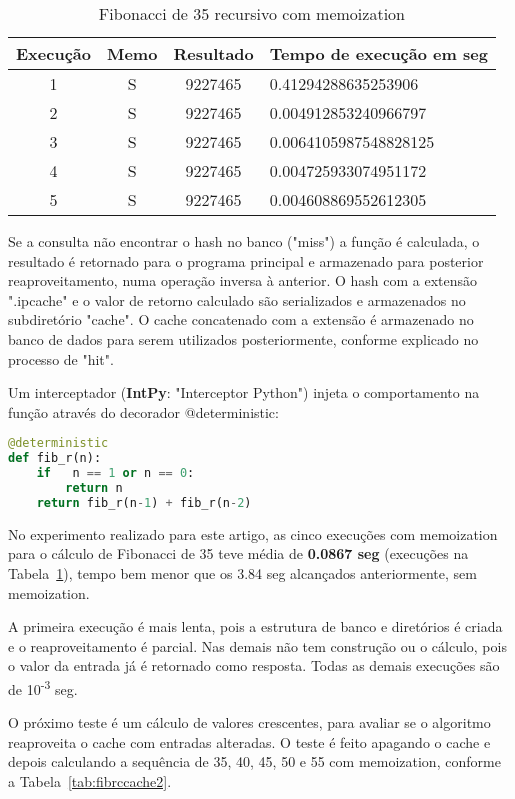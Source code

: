 \documentclass[sigconf]{acmart}
\begin{document}
\begin{table}[ht]
  \caption{Fibonacci de 35 recursivo com memoization}
  \label{tab:fibrccache}
  \begin{tabular}{cccl}
    \toprule
    Execução & Memo & Resultado & Tempo de execução em seg\\
    \midrule
    1 & S & 9227465 & 0.41294288635253906\\
    2 & S & 9227465 & 0.004912853240966797\\
    3 & S & 9227465 & 0.0064105987548828125\\
    4 & S & 9227465 & 0.004725933074951172\\
    5 & S & 9227465 & 0.004608869552612305\\
  \bottomrule
\end{tabular}
\end{table}

Se a consulta não encontrar o hash no banco ("miss") a função é calculada, o resultado é retornado para o programa principal e armazenado para posterior reaproveitamento, numa operação inversa à anterior. O hash com a extensão ".ipcache" e o valor de retorno calculado são serializados e armazenados no subdiretório "cache". O cache concatenado com a extensão é armazenado no banco de dados para serem utilizados posteriormente, conforme explicado no processo de "hit".

Um interceptador (\textbf{IntPy}: "Interceptor Python") injeta o comportamento na função através do decorador @deterministic:

\renewcommand{\lstlistingname}{Código}
\begin{lstlisting}[language=Python, caption=Fibonacci recursivo com memoization]
@deterministic
def fib_r(n):
    if   n == 1 or n == 0:
        return n
    return fib_r(n-1) + fib_r(n-2)
\end{lstlisting}

No experimento realizado para este artigo, as cinco execuções com memoization para o cálculo de Fibonacci de 35 teve média de \textbf{0.0867 seg} (execuções na Tabela~\ref{tab:fibrccache}), tempo bem menor que os 3.84 seg alcançados anteriormente, sem memoization.

A primeira execução é mais lenta, pois a estrutura de banco e diretórios é criada e o reaproveitamento é parcial. Nas demais não tem construção ou o cálculo, pois o valor da entrada já é retornado como resposta. Todas as demais execuções são de 10\textsuperscript{-3} seg.

O próximo teste é um cálculo de valores crescentes, para avaliar se o algoritmo reaproveita o cache com entradas alteradas. O teste é feito apagando o cache e depois calculando a sequência de 35, 40, 45, 50 e 55 com memoization, conforme a Tabela~\ref{tab:fibrccache2}.
\end{document}
